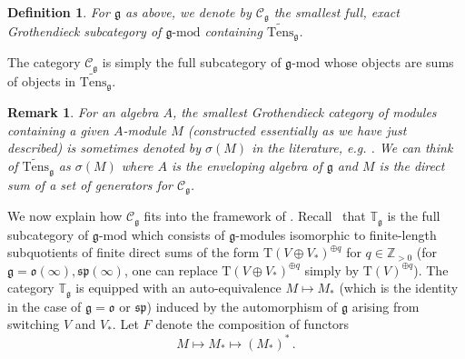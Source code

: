 \documentclass[11pt]{article}
\theoremstyle{plain}
\theoremstyle{nonumberplain}
\theoremstyle{plain}
\newtheorem{definition}[lemma]{Definition}
\newtheorem{remark}[lemma]{Remark}
\theoremstyle{nonumberplain}
\newcommand\bK{\mathbb K}
\newcommand\bT{\mathbb T}
\newcommand\cC{\mathcal C}
\newcommand\fg{\mathfrak{g}}
\newcommand\fsl{\mathfrak{sl}}
\newcommand\fo{\mathfrak{o}}
\newcommand\fsp{\mathfrak{sp}}
\begin{document}
\begin{definition}
  For $\fg$ as above, we denote by $\cC_\fg$ the smallest full, exact Grothendieck subcategory of $\fg\text{-mod}$ containing $\widetilde{\mathrm{Tens}}_\fg$. 
\end{definition}



  The category $\cC_\fg$ is simply the full subcategory of $\fg\text{-mod}$ whose objects are {sums} of objects in $\widetilde{\mathrm{Tens}}_\fg$. 

\begin{remark}\label{re.sigma}
For an algebra $A$, the smallest Grothendieck category of modules containing a given $A$-module $M$ (constructed essentially as we have just described) is sometimes denoted by $\sigma(M)$ in the literature{,} e.g. \cite[$\S$41]{BW}.  We can think of $\widetilde{\mathrm{Tens}}_\fg$ as $\sigma(M)$ where $A$ is the enveloping algebra of $\fg$ and $M$ is the direct sum of a set of generators for $\cC_\fg$.
\end{remark}



We now explain how $\cC_\fg$ fits into the framework of .
Recall~\cite{DPS} that $\bT_\fg$ is the full subcategory of $\fg\text{-mod}$ which consists of $\fg$-modules isomorphic to finite-length subquotients of finite direct sums of the form $\mathrm{T}\left(V\oplus V_*\right)^{\oplus q}$ for $q\in\mathbb{Z}_{>0}$ (for $\mathfrak{g}=\fo(\infty),\fsp(\infty)$, one can replace $\mathrm{T}\left(V\oplus V_*\right)^{\oplus q}$ simply by $\mathrm{T}(V)^{\oplus q}$).  
The category $\bT_\fg$ is equipped with an auto-equivalence
$M\mapsto M_*$ (which is the identity in the case of $\fg=\fo$ or
$\fsp$) induced by the automorphism of $\fg$ arising from switching
$V$ and $V_*$. Let $F$ denote the composition of functors
\begin{equation*}
  M\mapsto {M_*\mapsto} (M_*)^*\,.
\end{equation*}
\end{document}
